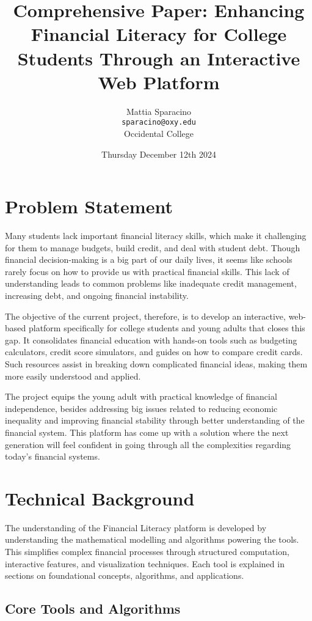 \documentclass[11pt,twocolumn]{article}
\title{Comprehensive Paper: Enhancing Financial Literacy for College Students Through an Interactive Web Platform}
\author{Mattia Sparacino \\ \texttt{sparacino@oxy.edu} \\ Occidental College}
\date{Thursday December 12th 2024}
\begin{document}
\maketitle

\section{Problem Statement}

Many students lack important financial literacy skills, which make it challenging for them to manage budgets, build credit, and deal with student debt. Though financial decision-making is a big part of our daily lives, it seems like schools rarely focus on how to provide us with practical financial skills. This lack of understanding leads to common problems like inadequate credit management, increasing debt, and ongoing financial instability.

The objective of the current project, therefore, is to develop an interactive, web-based platform specifically for college students and young adults that closes this gap. It consolidates financial education with hands-on tools such as budgeting calculators, credit score simulators, and guides on how to compare credit cards. Such resources assist in breaking down complicated financial ideas, making them more easily understood and applied.

The project equips the young adult with practical knowledge of financial independence, besides addressing big issues related to reducing economic inequality and improving financial stability through better understanding of the financial system. This platform has come up with a solution where the next generation will feel confident in going through all the complexities regarding today's financial systems.


\section{Technical Background}

The understanding of the Financial Literacy platform is developed by understanding the mathematical modelling and algorithms powering the tools. This simplifies complex financial processes through structured computation, interactive features, and visualization techniques. Each tool is explained in sections on foundational concepts, algorithms, and applications.

\subsection{Core Tools and Algorithms}
\end{document}
